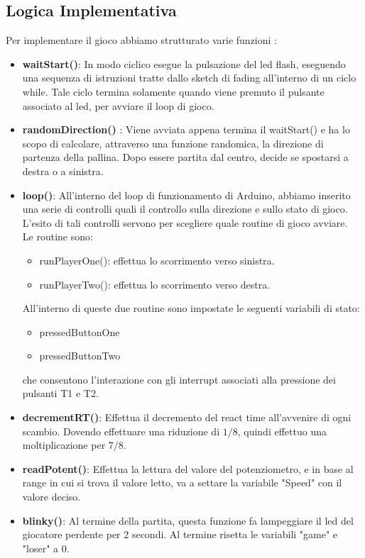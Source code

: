 \documentclass[a4paper]{article}
\begin{document}
\subsection*{Logica Implementativa}
Per implementare il gioco abbiamo strutturato varie funzioni :
\begin{itemize}
\item \textbf{waitStart()}: In modo ciclico esegue la pulsazione del led flash, eseguendo una sequenza di istruzioni tratte dallo sketch di fading all'interno di un ciclo while. Tale ciclo termina solamente quando viene premuto il pulsante associato al led, per avviare il loop di gioco.
\item \textbf{randomDirection()} : Viene avviata appena termina il waitStart() e ha lo scopo di calcolare, attraverso una funzione randomica, la direzione di partenza della pallina. Dopo essere partita dal centro, decide se spostarsi a destra o a sinistra.
 \item \textbf{loop()}: All'interno del loop di funzionamento di Arduino, abbiamo inserito una serie di controlli quali il controllo sulla direzione e sullo stato di gioco. L'esito di tali controlli servono per scegliere quale routine di gioco avviare. \\Le routine sono: 
\begin{itemize}
\item runPlayerOne(): effettua lo scorrimento verso sinistra.
\item runPlayerTwo(): effettua lo scorrimento verso destra.
\end{itemize}
All'interno di queste due routine sono impostate le seguenti variabili di stato:
\begin{itemize}
\item pressedButtonOne
\item pressedButtonTwo
\end{itemize}
che consentono l'interazione con gli interrupt associati alla pressione dei pulsanti T1 e T2.
\item \textbf{decrementRT()}: Effettua il decremento del react time all'avvenire di ogni scambio. Dovendo effettuare una riduzione di  $1/8$, quindi effettuo una moltiplicazione per $7/8$.
\item \textbf{readPotent()}: Effettua la lettura del valore del potenziometro, e in base al range in cui si trova il valore letto, va a settare la variabile "Speed" con il valore deciso.
\item \textbf{blinky()}: Al termine della partita, questa funzione fa lampeggiare il led del giocatore perdente per 2 secondi. Al termine risetta le variabili "game" e "loser" a 0.
\end{itemize}
\end{document}
